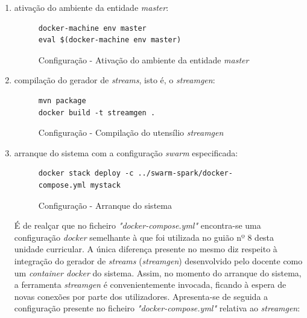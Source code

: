 \documentclass[a4paper]{report}
\begin{document}
{\begin{enumerate}[label=\textbf{\arabic*.}]
                \item ativação do ambiente da entidade \textsl{master}:
                \begin{figure}[H]
                    \centering
                    \begin{verbatim}
docker-machine env master
eval $(docker-machine env master)
                    \end{verbatim}
                    \vspace{-5mm}
                    \caption{Configuração - Ativação do ambiente da entidade \textsl{master}}
                    \label{fig:7}
                \end{figure}

                \item compilação do gerador de \textit{streams}, isto é, o \textit{streamgen}:
                \begin{figure}[H]
                    \centering
                    \begin{verbatim}
mvn package
docker build -t streamgen .
                    \end{verbatim}
                    \vspace{-5mm}
                    \caption{Configuração - Compilação do utensílio \textit{streamgen}}
                    \label{fig:9}
                \end{figure}

                \item arranque do sistema com a configuração \textit{swarm} especificada:
                \begin{figure}[H]
                    \centering
                    \begin{verbatim}
docker stack deploy -c ../swarm-spark/docker-compose.yml mystack
                    \end{verbatim}
                    \vspace{-5mm}
                    \caption{Configuração - Arranque do sistema}
                    \label{fig:10}
                \end{figure}

                É de realçar que no ficheiro \textit{"docker-compose.yml"} encontra-se uma configuração \textit{docker} semelhante à que foi utilizada no guião nº 8 desta unidade curricular.
                A única diferença presente no mesmo diz respeito à integração do gerador de \textit{streams} (\textit{streamgen}) desenvolvido pelo docente como um \textit{container docker} do sistema.
                Assim, no momento do arranque do sistema, a ferramenta \textit{streamgen} é convenientemente invocada, ficando à espera de novas conexões por parte dos utilizadores.
                Apresenta-se de seguida a configuração presente no ficheiro \textit{"docker-compose.yml"} relativa ao \textit{streamgen}:


\end{enumerate}}
\end{document}
